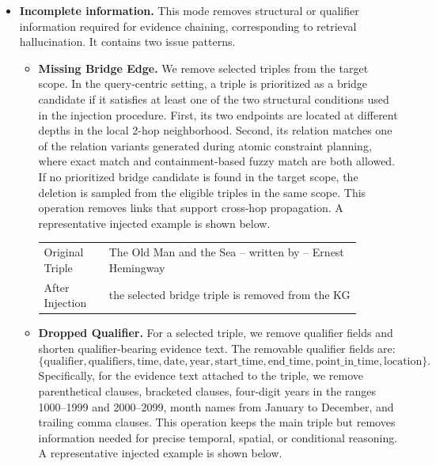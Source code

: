 \documentclass{article}
\theoremstyle{plain}
\theoremstyle{definition}
\theoremstyle{remark}
\begin{document}
\begin{itemize}
    \item \textbf{Incomplete information.}
    This mode removes structural or qualifier information required for evidence chaining, corresponding to retrieval hallucination. 
    It contains two issue patterns.

    \begin{itemize}
        \item \textbf{Missing Bridge Edge.}
        We remove selected triples from the target scope. 
        In the query-centric setting, a triple is prioritized as a bridge candidate if it satisfies at least one of the two structural conditions used in the injection procedure. 
        First, its two endpoints are located at different depths in the local 2-hop neighborhood. 
        Second, its relation matches one of the relation variants generated during atomic constraint planning, where exact match and containment-based fuzzy match are both allowed. 
        If no prioritized bridge candidate is found in the target scope, the deletion is sampled from the eligible triples in the same scope. 
        This operation removes links that support cross-hop propagation. A representative injected example is shown below.

         \begin{center}
        \small
        \begin{tabular}{@{}p{0.18\linewidth}p{0.7\linewidth}@{}}
        \toprule
       Original Triple & \small The Old Man and the Sea -- written by -- Ernest Hemingway \\
        After Injection & \small the selected bridge triple is removed from the KG \\
        \bottomrule
        \end{tabular}
        \end{center}

        \item \textbf{Dropped Qualifier.}
        For a selected triple, we remove qualifier fields and shorten qualifier-bearing evidence text. 
        The removable qualifier fields are:
        \[
        \{\text{qualifier}, \text{qualifiers}, \text{time}, \text{date}, \text{year}, 
        \text{start\_time}, \text{end\_time}, \text{point\_in\_time}, \text{location}\}.
        \]
        Specifically, for the evidence text attached to the triple, we remove parenthetical clauses, bracketed clauses, four-digit years in the ranges 1000--1999 and 2000--2099, month names from January to December, and trailing comma clauses. 
        This operation keeps the main triple but removes information needed for precise temporal, spatial, or conditional reasoning. A representative injected example is shown below.


\end{itemize}
\end{itemize}
\end{document}
